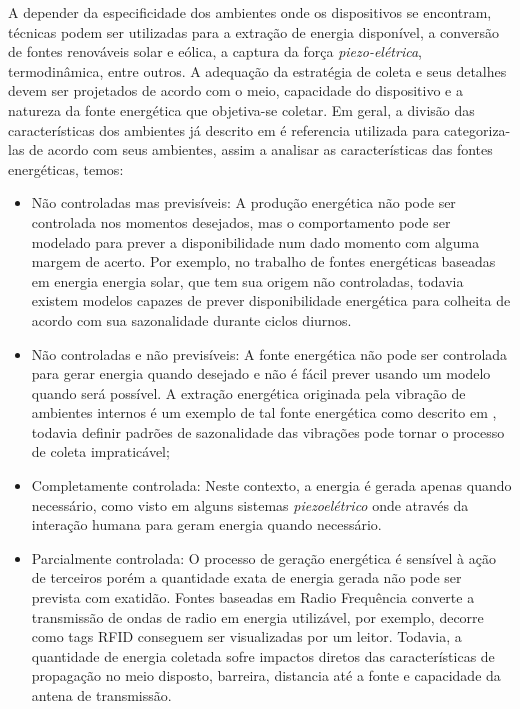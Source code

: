 A depender da especificidade dos ambientes onde os dispositivos se encontram, técnicas podem ser utilizadas para a extração de energia disponível, a conversão de fontes renováveis solar e eólica, a captura da força \textit{piezo-elétrica}, termodinâmica, entre outros. A adequação da estratégia de coleta e seus detalhes devem ser projetados de acordo com o meio, capacidade do dispositivo e a natureza da fonte energética que objetiva-se coletar. Em geral, a divisão das características dos ambientes já descrito em \cite{shaikh_energy_2016} é referencia utilizada para categoriza-las de acordo com seus ambientes, assim a analisar as características das fontes energéticas, temos:

\begin{itemize}

    \item Não controladas mas previsíveis: A produção energética não pode ser controlada nos momentos desejados, mas o comportamento pode ser modelado para prever a disponibilidade num dado momento com alguma margem de acerto. Por exemplo, no trabalho de  \cite{lee_energy_2018} fontes energéticas baseadas em energia energia solar, que tem sua origem não controladas, todavia existem modelos capazes de prever  disponibilidade energética para colheita de acordo com sua sazonalidade durante ciclos diurnos.
    
    \item Não controladas e não previsíveis: A fonte energética não pode ser controlada para gerar energia quando desejado e não é fácil prever usando um modelo quando será possível. A extração energética originada pela vibração de ambientes internos é um exemplo de tal fonte energética como descrito em \cite{wei_comprehensive_2017}, todavia definir padrões de sazonalidade das vibrações pode tornar o processo de coleta impraticável;
    
    \item Completamente controlada: Neste contexto, a energia é gerada apenas quando necessário, como visto em alguns sistemas \textit{piezoelétrico} onde através da interação humana para geram energia quando necessário.
    
    \item Parcialmente controlada: O processo de geração energética é sensível à ação de terceiros porém a quantidade exata de energia gerada não pode ser prevista com exatidão. Fontes baseadas em Radio Frequência converte a transmissão de ondas de radio em energia utilizável, por exemplo, \cite{shaikh_energy_2016} decorre como tags \acf{RFID} conseguem ser visualizadas por um leitor. Todavia, a quantidade de energia coletada sofre impactos diretos das características de propagação no meio disposto, barreira, distancia até a fonte e capacidade da antena de transmissão.
\end{itemize}

